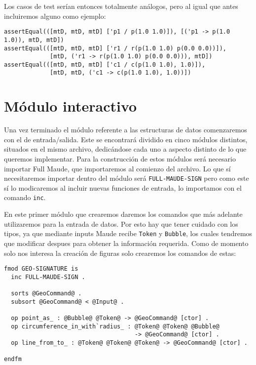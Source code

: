 Los casos de test serían entonces totalmente análogos, pero al igual que antes incluiremos alguno como ejemplo:

{\codesize
\begin{verbatim}
assertEqual(([mtD, mtD, mtD] ['p1 / p(1.0 1.0)]), [('p1 -> p(1.0 1.0)), mtD, mtD])
assertEqual(([mtD, mtD, mtD] ['r1 / r(p(1.0 1.0) p(0.0 0.0))]),
             [mtD, ('r1 -> r(p(1.0 1.0) p(0.0 0.0))), mtD])
assertEqual(([mtD, mtD, mtD] ['c1 / c(p(1.0 1.0), 1.0)]), 
             [mtD, mtD, ('c1 -> c(p(1.0 1.0), 1.0))])
\end{verbatim}
}

\section{Módulo interactivo}

Una vez terminado el módulo referente a las estructuras de datos comenzaremos con el de entrada/salida. Este se encontrará dividido en cinco módulos distintos, situados en el mismo archivo, dedicándose cada uno a aspecto distinto de lo que queremos implementar. Para la construcción de estos módulos será necesario importar Full Maude, que importaremos al comienzo del archivo. Lo que sí necesitaremos importar dentro del módulo será \verb"FULL-MAUDE-SIGN" pero como este sí lo modicaremos al incluir nuevas funciones de entrada, lo importamos con el comando \verb"inc". \par

En este primer módulo que crearemos daremos los comandos que más adelante utilizaremos para la entrada de datos. Por esto hay que tener cuidado con los tipos, ya que mediante inputs Maude recibe \verb"Token" y \verb"Bubble",
los cuales tendremos que modificar despues para obtener la información requerida. Como de momento solo nos interesa la creación de figuras solo crearemos los comandos de estas:\par

{\codesize
\begin{verbatim}
fmod GEO-SIGNATURE is
  inc FULL-MAUDE-SIGN .

  sorts @GeoCommand@ .
  subsort @GeoCommand@ < @Input@ .

  op point_as_ : @Bubble@ @Token@ -> @GeoCommand@ [ctor] .
  op circumference_in_with`radius_ : @Token@ @Token@ @Bubble@ 
                                     -> @GeoCommand@ [ctor] .
  op line_from_to_ : @Token@ @Token@ @Token@ -> @GeoCommand@ [ctor] .

endfm
\end{verbatim}
}

